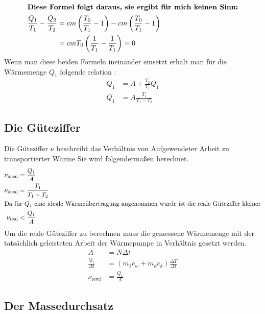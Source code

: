 \begin{align*}
\intertext{\textbf{Diese Formel folgt daraus, sie ergibt für mich keinen Sinn:}}
    \frac{Q_{1}}{T_{1}} - \frac{Q_{2}}{T_{2}} &= c m \left(\frac{T_{0}}{T_{1}} - 1 \right) -c m \left(\frac{T_{0}}{T_{1}} - 1 \right) \\
     &= c m T_{0} \left(\frac{1}{T_{1}} - \frac{1}{T_{1}}\right) = 0
\end{align*}
Wenn man diese beiden Formeln ineinander einsetzt erhält man für die Wärmemenge $Q_1$ folgende relation \cite{man:v206}: 
\begin{align}
    Q_1 &= A + \frac{T_2}{T_1}Q_1 \\
    Q_1 &= A \frac{T_1}{T_1 - T_2}
\end{align}

\subsection{Die Güteziffer}
Die Güteziffer $ \nu $ beschreibt das Verhältnis von Aufgewendeter Arbeit zu transportierter Wärme \cite[vgl.][S.1]{man:v206}
Sie wird folgendermaßen berechnet.
\begin{align}
    \nu_{\text{ideal}} &= \frac{Q_{1}}{A} \\
    \nu_{\text{ideal}} &= \frac{T_1}{T_1 - T_2}\\
    \label{eq:gueteTheorie}
    \intertext{Da für $ Q_1 $ eine ideale Wärmeübertragung angenommen wurde ist die reale Güteziffer kleiner}
    \nu_{\text{real}} &< \frac{Q_{1}}{A} 
\end{align}
Um die reale Güteziffer zu berechnen muss die gemessene Wärmemenge mit der tatsächlich geleisteten
Arbeit der Wärmepumpe in Verhältnis gesetzt werden.
\begin{align}
    \nonumber A &= N \Delta t \\
    \nonumber \frac{Q_1}{\Delta t} &= (m_1 c_w + m_k c_k) \frac{\Delta T}{\Delta t} \\
    \nu_{\text{rewl}} &= \frac{Q_{1}}{A} 
    \label{eq:guetePraxis}
\end{align}


\subsection{Der Massedurchsatz}
